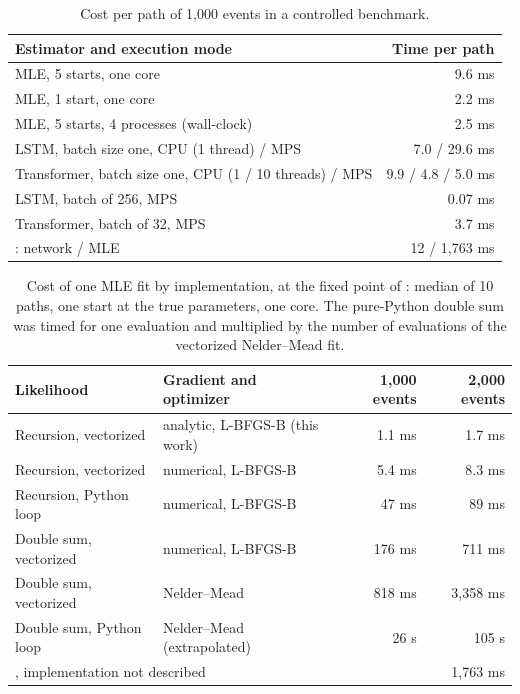 \documentclass[preprint,12pt,authoryear]{elsarticle}
\begin{document}
\begin{table}[t]
\centering
\caption{Cost per path of 1,000 events in a controlled benchmark.}
\label{tab:cost}
\small
\begin{tabular}{lr}
\toprule
Estimator and execution mode & Time per path\\
\midrule
MLE, 5 starts, one core & 9.6 ms\\
MLE, 1 start, one core & 2.2 ms\\
MLE, 5 starts, 4 processes (wall-clock) & 2.5 ms\\
LSTM, batch size one, CPU (1 thread) / MPS & 7.0 / 29.6 ms\\
Transformer, batch size one, CPU (1 / 10 threads) / MPS & 9.9 / 4.8 / 5.0 ms\\
LSTM, batch of 256, MPS & 0.07 ms\\
Transformer, batch of 32, MPS & 3.7 ms\\
\midrule
\citet{lee2023}: network / MLE & 12 / 1,763 ms\\
\bottomrule
\end{tabular}
\end{table}

\begin{table}[t]
\centering
\caption{Cost of one MLE fit by implementation, at the fixed point of \citet{lee2023}: median of
10 paths, one start at the true parameters, one core. The pure-Python double sum was timed for
one evaluation and multiplied by the number of evaluations of the vectorized Nelder--Mead fit.}
\label{tab:cost-variants}
\small
\begin{tabular}{llrr}
\toprule
Likelihood & Gradient and optimizer & 1,000 events & 2,000 events\\
\midrule
Recursion, vectorized & analytic, L-BFGS-B (this work) & 1.1 ms & 1.7 ms\\
Recursion, vectorized & numerical, L-BFGS-B & 5.4 ms & 8.3 ms\\
Recursion, Python loop & numerical, L-BFGS-B & 47 ms & 89 ms\\
Double sum, vectorized & numerical, L-BFGS-B & 176 ms & 711 ms\\
Double sum, vectorized & Nelder--Mead & 818 ms & 3,358 ms\\
Double sum, Python loop & Nelder--Mead (extrapolated) & 26 s & 105 s\\
\midrule
\multicolumn{3}{l}{\citet{lee2023}, implementation not described} & 1,763 ms\\
\bottomrule
\end{tabular}
\end{table}
\end{document}
